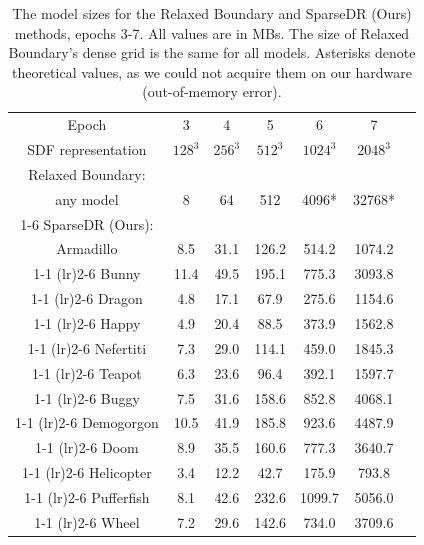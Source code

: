 \documentclass{ieeeaccess}
\begin{document}
\begin{table}
    \centering
    \caption{The model sizes for the Relaxed Boundary and SparseDR (Ours) methods, epochs 3-7. All values are in MBs. The size of Relaxed Boundary's dense grid is the same for all models. Asterisks denote theoretical values, as we could not acquire them on our hardware (out-of-memory error). }
        \begin{tabular}{ccccccc}
        \toprule
        Epoch & 3 & 4 & 5 & 6 & 7  \\
        SDF representation & $128^3$ & $256^3$ & $512^3$ & $1024^3$ & $2048^3$  \\
        \midrule[\heavyrulewidth]
        Relaxed Boundary: & & &  & & \\
         any model & 8 & 64 & 512 & 4096* & 32768* \\
        \cmidrule(lr){1-6}
        SparseDR (Ours): & & &  & & \\
        Armadillo      &          8.5 & 31.1 & 126.2 & 514.2 & 1074.2  \\
        \cmidrule(lr){1-1}  \cmidrule(lr){2-6}
        Bunny          &         11.4 & 49.5 & 195.1 & 775.3 & 3093.8  \\
        \cmidrule(lr){1-1}  \cmidrule(lr){2-6}
        Dragon         & 4.8 & 17.1 & 67.9 & 275.6 & 1154.6  \\
        \cmidrule(lr){1-1}  \cmidrule(lr){2-6}
        Happy          & 4.9 & 20.4 & 88.5 & 373.9 & 1562.8  \\
        \cmidrule(lr){1-1}  \cmidrule(lr){2-6}
        Nefertiti      & 7.3 & 29.0 & 114.1 & 459.0 & 1845.3  \\
        \cmidrule(lr){1-1}  \cmidrule(lr){2-6}
        Teapot         & 6.3 & 23.6 & 96.4 & 392.1 & 1597.7  \\
        \cmidrule(lr){1-1}  \cmidrule(lr){2-6}
        Buggy          & 7.5 & 31.6 & 158.6 & 852.8 & 4068.1  \\
        \cmidrule(lr){1-1}  \cmidrule(lr){2-6}
        Demogorgon    &     10.5 & 41.9 & 185.8 & 923.6 & 4487.9  \\
        \cmidrule(lr){1-1}  \cmidrule(lr){2-6}
        Doom         &     8.9 & 35.5 & 160.6 & 777.3 & 3640.7  \\
        \cmidrule(lr){1-1}  \cmidrule(lr){2-6}
        Helicopter     & 3.4 & 12.2 & 42.7 & 175.9 & 793.8  \\
        \cmidrule(lr){1-1}  \cmidrule(lr){2-6}
        Pufferfish    &  8.1 & 42.6 & 232.6 & 1099.7 & 5056.0  \\
        \cmidrule(lr){1-1}  \cmidrule(lr){2-6}
        Wheel          & 7.2 & 29.6 & 142.6 & 734.0 & 3709.6  \\
        \bottomrule
    \end{tabular}
    \label{tab:comp_size}
\end{table}
\end{document}
